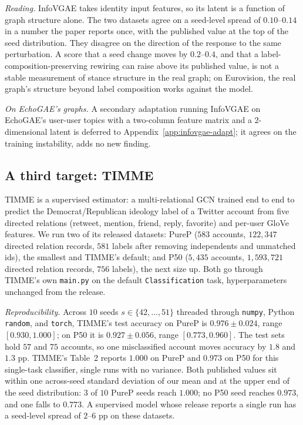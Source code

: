 \documentclass[letterpaper]{article} %
\begin{document}
\emph{Reading.} InfoVGAE takes identity input features, so its
latent is a function of graph structure alone. The two datasets
agree on a seed-level spread of $0.10$--$0.14$ in a number the
paper reports once, with the published value at the top of the
seed distribution. They disagree on the direction of the
response to the same perturbation. A score that a seed change
moves by $0.2$--$0.4$, and that a label-composition-preserving
rewiring can raise above its published value, is not a stable
measurement of stance structure in the real graph; on
Eurovision, the real graph's structure beyond label composition
works against the model.

\emph{On EchoGAE's graphs.} A secondary adaptation running
InfoVGAE on EchoGAE's user-user topics with a two-column
feature matrix and a $2$-dimensional latent is deferred to
Appendix~\ref{app:infovgae-adapt}; it agrees on the training
instability, adds no new finding.

\subsection{A third target: TIMME}\label{sec:timme}

TIMME \citep{XiaoTIMME2020} is a supervised estimator: a
multi-relational GCN trained end to end to predict the
Democrat/Republican ideology label of a Twitter account from
five directed relations (retweet, mention, friend, reply,
favorite) and per-user GloVe features. We run two of its
released datasets: PureP ($583$ accounts, $122{,}347$ directed
relation records, $581$ labels after removing independents and
unmatched ids), the smallest and TIMME's default; and P50
($5{,}435$ accounts, $1{,}593{,}721$ directed relation records,
$756$ labels), the next size up. Both go through TIMME's own
\texttt{main.py} on the default \texttt{Classification} task,
hyperparameters unchanged from the release.

\emph{Reproducibility.} Across $10$ seeds
$s \in \{42, \ldots, 51\}$ threaded through
\texttt{numpy}, Python \texttt{random}, and \texttt{torch},
TIMME's test accuracy on PureP is $0.976 \pm 0.024$, range
$[0.930, 1.000]$; on P50 it is $0.927 \pm 0.056$, range
$[0.773, 0.960]$. The test sets hold $57$ and $75$ accounts,
so one misclassified account moves accuracy by $1.8$ and
$1.3$ pp. TIMME's Table~2 reports $1.000$ on PureP and
$0.973$ on P50 for this single-task classifier, single runs
with no variance. Both published values sit within one
across-seed standard deviation of our mean and at the upper
end of the seed distribution: $3$ of $10$ PureP seeds reach
$1.000$; no P50 seed reaches $0.973$, and one falls to
$0.773$. A supervised model whose release reports a single
run has a seed-level spread of $2$--$6$ pp on these datasets.
\end{document}

